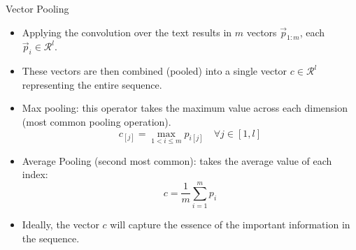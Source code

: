 \documentclass[handout]{beamer}
\begin{document}
\begin{frame}{Vector Pooling}
\begin{scriptsize}
\begin{itemize}
\item Applying the convolution over the text results in $m$ vectors $\vec{p}_{1:m}$, each $\vec{p}_i \in \mathcal{R}^l$.
\item These vectors are then combined (pooled) into a single vector $c \in \mathcal{R}^l$ representing the entire sequence.
\item Max pooling: this operator takes the maximum value across each dimension (most common pooling operation).
\begin{displaymath}
c_[j]= \max_{1< i \leq m} p_{i[j]} \quad \forall j \in [1,l]
\end{displaymath}

\item Average Pooling (second most common): takes the average value of each index:
\begin{displaymath}
c = \frac{1}{m} \sum_{i=1}^{m}p_i
\end{displaymath}

\item Ideally, the vector $c$ will capture the essence of the important information in the sequence. 

\end{itemize}
\end{scriptsize}
\end{frame}
\end{document}
